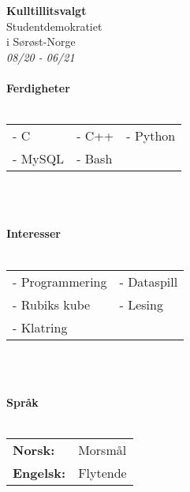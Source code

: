 \documentclass[a4paper, 12pt]{article}
\begin{document}
\begin{minipage}[t]{0.3\textwidth}
        \normalsize\textbf{Kulltillitsvalgt}\\
        \small{Studentdemokratiet \\i Sørøst-Norge}\\
        \small{\textit{08/20 - 06/21}}\\\\
        \horizontalline{2cm}{0.4cm}
        \Large\textbf{Ferdigheter}\\\\
        \normalsize{
        \begin{tabular}{@{}l l l}
            - C & - C++ & - Python \\
            - MySQL & - Bash & \\
        \end{tabular}\\\\
    }
        \horizontalline{2cm}{0.4cm}
        \Large\textbf{Interesser}\\\\
        \normalsize{
        \begin{tabular}{@{}l l}
            - Programmering & - Dataspill \\
            - Rubiks kube & - Lesing \\
            - Klatring & \\
        \end{tabular}\\\\
    }
        \horizontalline{2cm}{0.4cm}
        \Large\textbf{Språk}\\\\
        \normalsize{
        \begin{tabular}{@{}l l}
            \textbf{Norsk:} & Morsmål \\
            \textbf{Engelsk:} & Flytende \\
        \end{tabular}
    }
    \end{minipage}
    \hfill{\color{lightgray}\vline}\hfill
\end{document}
